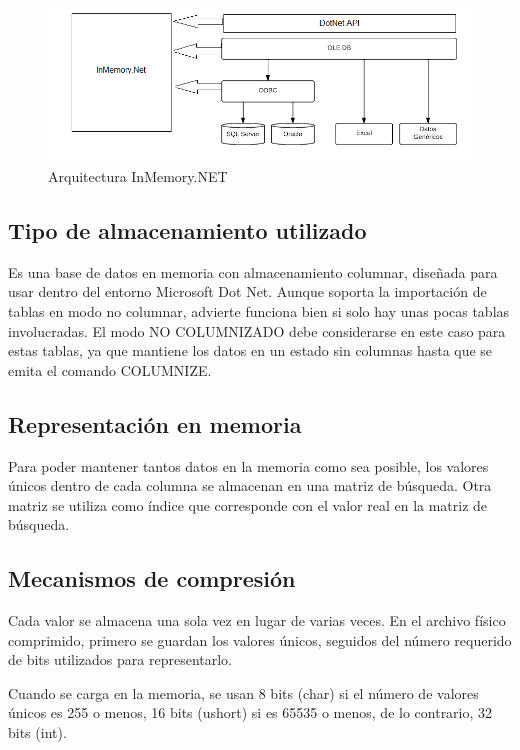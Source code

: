 \documentclass{acmart}
\begin{document}
\begin{figure}
	\includegraphics[width=\linewidth]{architecture_IRDB.png} %
	\caption{Arquitectura InMemory.NET} %
	\label{irdb} %
\end{figure}

\subsection{Tipo de almacenamiento utilizado}

Es una base de datos en memoria con almacenamiento columnar, diseñada para usar dentro del entorno Microsoft Dot Net. Aunque soporta la importación de tablas en modo no columnar, advierte funciona bien si solo hay unas pocas tablas involucradas. El modo NO COLUMNIZADO debe considerarse en este caso para estas tablas, ya que mantiene los datos en un estado sin columnas hasta que se emita el comando COLUMNIZE.

\subsection{Representación en memoria}

Para poder mantener tantos datos en la memoria como sea posible, los valores únicos dentro de cada columna se almacenan en una matriz de búsqueda. Otra matriz se utiliza como índice que corresponde con el valor real en la matriz de búsqueda.

\subsection{Mecanismos de compresión}

Cada valor se almacena una sola vez en lugar de varias veces. En el archivo físico comprimido, primero se guardan los valores únicos, seguidos del número requerido de bits utilizados para representarlo.

Cuando se carga en la memoria, se usan 8 bits (char) si el número de valores únicos es 255 o menos, 16 bits (ushort) si es 65535 o menos, de lo contrario, 32 bits (int).
\end{document}
